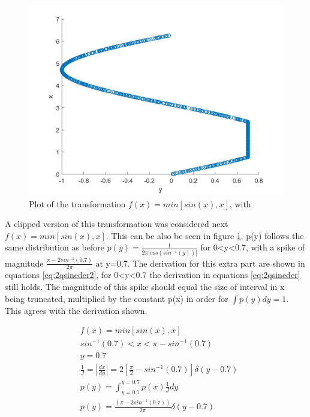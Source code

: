 \documentclass[twoside,twocolumn]{article}
\begin{document}
\begin{figure}[h]
  \centering
    \includegraphics[width=\linewidth]{2clipped}
  \caption{Plot of the transformation $f(x)=min[sin(x),x]$, with  }
  \label{fig:2sine}
\end{figure}

A clipped version of this transformation was considered next $f(x)=min[sin(x),x]$. This can be also be seen in figure \ref{fig:2sine}. p(y) follows the same distribution as before $p(y)=\frac{1}{2\pi|cos(sin^{-1}(y))|}$ for 0<y<0.7, with a spike of magnitude $\frac{\pi-2sin^{-1}(0.7)}{2\pi}$ at y=0.7. The derivation for this extra part are shown in equations \ref{eq:2qsineder2}, for 0<y<0.7 the derivation in equations \ref{eq:2qsineder} still holds. The magnitude of this spike should equal the size of interval in x being truncated, multiplied by the constant p(x) in order for $\int p(y) dy =1 $. This agrees with the derivation shown.

\begin{equation}
\label{eq:2qsineder2}
\begin{split}
&f(x)=min[sin(x),x]\\
&sin^{-1}(0.7) < x < \pi-sin^{-1}(0.7)\\
&y=0.7\\
&\frac{1}{J}=|\frac{dx}{dy}|=2[\frac{\pi}{2}-sin^{-1}(0.7)]\delta(y-0.7)\\
&p(y) = \int^{y=0.7}_{y=0.7} p(x)\frac{1}{J} dy \\
&p(y)=\frac{(\pi-2sin^{-1}(0.7))}{2\pi}\delta(y-0.7)\\
\end{split}
\end{equation}
\end{document}
